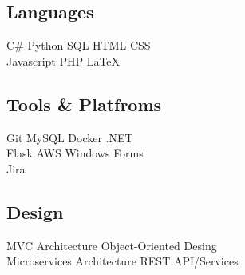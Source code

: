 \documentclass[]{farzad-resume}
\begin{document}
\begin{minipage}[t]{0.30\textwidth}
\subsection{Languages}
C\# \textbullet{}  Python \textbullet{} SQL \textbullet {}  HTML\textbullet{} CSS \\ 
Javascript \textbullet{} PHP \textbullet{} \LaTeX\
\sectionsep

\subsection{Tools \& Platfroms}
Git \textbullet{}  MySQL \textbullet{} Docker \textbullet{} {\Large .}NET\\
Flask\textbullet{} AWS \textbullet{} Windows Forms\\
Jira
\sectionsep

\subsection{Design}
MVC Architecture \textbullet{} Object-Oriented Desing \\
Microservices Architecture \textbullet{}REST API/Services\\


%
%

\end{minipage}
\hfill
\end{document}
